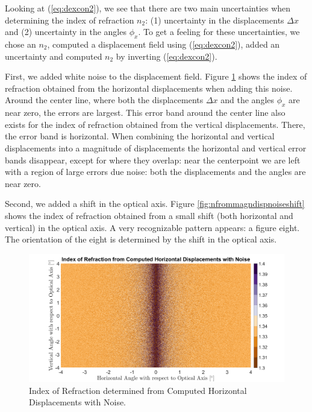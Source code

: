 \documentclass{article}
\begin{document}
Looking at (\ref{eq:dexcon2}), we see that there are two main uncertainties when determining the index of refraction $n_2$: (1) uncertainty in the displacements $\Delta x$ and (2) uncertainty in the angles $\phi_x$. To get a feeling for these uncertainties, we chose an $n_2$, computed a displacement field using (\ref{eq:dexcon2}), added an uncertainty and computed $n_2$ by inverting (\ref{eq:dexcon2}). 

First, we added white noise to the displacement field. Figure \ref{fig:nfromhordispnoise} shows the index of refraction obtained from the horizontal displacements when adding this noise. Around the center line, where both the displacements $\Delta x$ and the angles $\phi_x$ are near zero, the errors are largest. This error band around the center line also exists for the index of refraction obtained from the vertical displacements. There, the error band is horizontal. When combining the horizontal and vertical displacements into a magnitude of displacements the horizontal and vertical error bands disappear, except for where they overlap: near the centerpoint we are left with a region of large errors due noise: both the displacements and the angles are near zero. 

Second, we added a shift in the optical axis. Figure \ref{fig:nfrommagndispnoiseshift} shows the index of refraction obtained from a small shift (both horizontal and vertical) in the optical axis. A very recognizable pattern appears: a figure eight. The orientation of the eight is determined by the shift in the optical axis. 


\begin{figure}
\centering \includegraphics[width=\linewidth]{nfromhordispnoise.png}
\caption{Index of Refraction determined from Computed Horizontal Displacements with Noise.}
\label{fig:nfromhordispnoise}
\end{figure}
\end{document}
